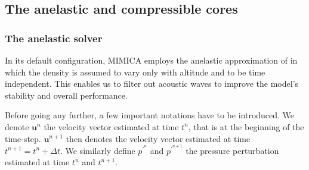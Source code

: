 \documentclass[12pt,A4,french]{article}
\begin{document}
\subsection{The anelastic and compressible cores}

\subsubsection{The anelastic solver}

In its default configuration, MIMICA employs the anelastic approximation of \cite{LH1982} in which the density is assumed to vary only with altitude and to be time independent. This enables us to filter out acoustic waves to improve the model's stability and overall performance.

Before going any further, a few important notations have to be introduced. We denote ${\mathbf u}^{n}$ the velocity vector estimated at time $t^n$, that is at the beginning of the time-step. ${\mathbf u}^{n+1}$ then denotes the velocity vector estimated at time $t^{n+1} = t^n + \Delta t$. We similarly define $p^{\prime^n}$ and $p^{\prime^{n+1}}$ the pressure perturbation estimated at time $t^n$ and $t^{n+1}$.
\end{document}
